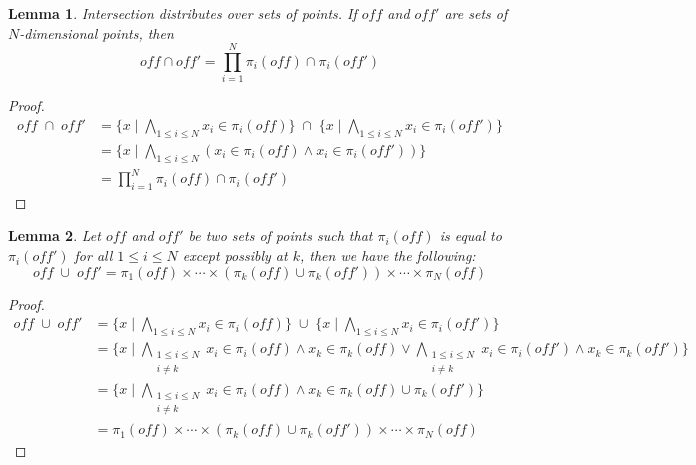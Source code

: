 \documentclass[acmlarge,review]{acmart}
\theoremstyle{definition}
\theoremstyle{plain}
\newtheorem{lem}{Lemma}
\theoremstyle{remark}
\begin{document}
\begin{lem}{}\label{lem:vector-intersect}
  Intersection distributes over sets of points. If $\mathit{off}$ and
  $\mathit{off'}$ are sets of $N$-dimensional points, then
%
  \begin{equation*}
    \mathit{off} \cap \mathit{off'} =
      \prod_{i = 1}^{N} \pi_i(\mathit{off}) \cap \pi_i(\mathit{off'})
  \end{equation*}
\end{lem}
%
\begin{proof}
  \begin{align*}
    \mathit{off} \; \cap \; \mathit{off'} &
    = \{x \mid \bigwedge_{1 \leq i \leq N } x_i \in \pi_i(\mathit{off}) \}
      \;\cap\;
      \{x \mid \bigwedge_{1 \leq i \leq N } x_i \in \pi_i(\mathit{off'}) \} \\
    & = \{x \mid \bigwedge_{1 \leq i \leq N }
      (x_i \in \pi_i(\mathit{off}) \wedge x_i \in \pi_i(\mathit{off'})) \} \\
    & = \prod_{i = 1}^{N} \pi_i(\mathit{off}) \cap \pi_i(\mathit{off'})
  \end{align*}
\end{proof}

\begin{lem}{}\label{lem:vector-union}
  Let $\mathit{off}$ and $\mathit{off'}$ be two sets of
  points such that $\pi_i(\mathit{off})$ is equal to $\pi_i(\mathit{off'})$ for all $1
  \leq i \leq N$ except possibly at $k$, then we have the following:
%
  \begin{equation*}
    \mathit{off} \; \cup \; \mathit{off'}
    =
    \pi_1(\mathit{off}) \times \cdots \times
    (\pi_k(\mathit{off}) \cup \pi_k(\mathit{off'})) \times \cdots \times
    \pi_N(\mathit{off})
  \end{equation*}
\end{lem}
%
\begin{proof}
  \begin{align*}
    \mathit{off} \; \cup \; \mathit{off'} &
    = \{x \mid
      \bigwedge_{1 \leq i \leq N } x_i \in \pi_i(\mathit{off}) \}
      \;\cup\;
      \{x \mid
          \bigwedge_{1 \leq i \leq N } x_i \in \pi_i(\mathit{off'}) \} \\
    & = \{x \mid
          \bigwedge_{\substack{1 \leq i \leq N \\ i \neq k}}
            x_i \in \pi_i(\mathit{off}) \wedge x_k \in \pi_k(\mathit{off}) \vee
          \bigwedge_{\substack{1 \leq i \leq N \\ i \neq k}} x_i \in
            \pi_i(\mathit{off'}) \wedge x_k \in \pi_k(\mathit{off'})
        \} \\
    & = \{x \mid
          \bigwedge_{\substack{1 \leq i \leq N \\ i \neq k}} x_i \in
            \pi_i(\mathit{off}) \wedge
            x_k \in \pi_k(\mathit{off}) \cup \pi_k(\mathit{off'})
        \} \\
        & = \pi_1(\mathit{off}) \times \cdots \times
        (\pi_k(\mathit{off}) \cup \pi_k(\mathit{off'})) \times \cdots \times
        \pi_N(\mathit{off})
  \end{align*}
\end{proof}
\end{document}
